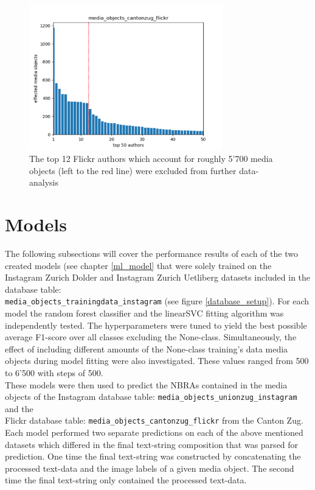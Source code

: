 \begin{figure}[ht]
   \centering
   \includegraphics[width=0.75\textwidth]{img/cantonzug_flickr_top50_w_line}
   \caption{The top 12 Flickr authors which account for roughly 5'700 media objects (left to the red line) were excluded from further data-analysis}
   \label{img:dominant_users_flickr}
\end{figure}

\section{Models} \label{results_models}
The following subsections will cover the  performance results of each of the two created models (see chapter \ref{ml_model} that were solely trained on the Instagram Zurich Dolder and Instagram Zurich Uetliberg datasets included in the database table:\\ \texttt{media\_objects\_trainingdata\_instagram} (see figure \ref{database_setup}). For each model the random forest classifier and the linearSVC fitting algorithm was independently tested. The hyperparameters were tuned to yield the best possible average F1-score over all classes excluding the None-class. Simultaneously, the effect of including different amounts of the None-class training's data media objects during model fitting were also investigated. These values ranged from 500 to 6'500 with steps of 500.\\
These models were then used to predict the NBRAs contained in the media objects of the Instagram database table: \texttt{media\_objects\_unionzug\_instagram} and the \\Flickr database table: \texttt{media\_objects\_cantonzug\_flickr} from the Canton Zug.\\
Each model performed two separate predictions on each of the above mentioned datasets which differed in the final text-string composition that was parsed for prediction. One time the final text-string was constructed by concatenating the processed text-data and the image labels of a given media object. The second time the final text-string only contained the processed text-data.

